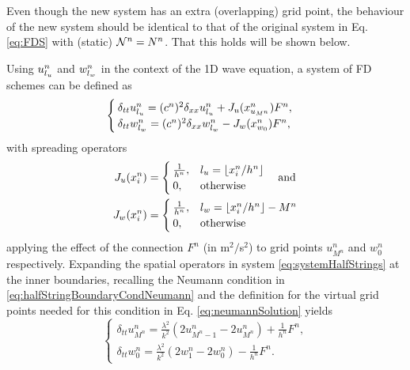 Even though the new system has an extra (overlapping) grid point, the behaviour of the new system should be identical to that of the original system in Eq. \eqref{eq:FDS} with (static) $\mathcal{N}^n = N^n$. That this holds will be shown below.

Using $u_{l_u}^n$ and $w_{l_w}^n$ in the context of the 1D wave equation, a system of FD schemes can be defined as
\begin{equation}
    \begin{cases}\label{eq:systemHalfStrings}
        \delta_{tt}u_{l_u}^n = (c^n)^2\delta_{xx}u_{l_u}^n + J_u(x_{u_{M^n}}^n)F^n,\\
        \delta_{tt}w_{l_w}^n = (c^n)^2\delta_{xx}w_{l_w}^n - J_w(x_{w_0}^n)F^n,
    \end{cases}
\end{equation}
with spreading operators
\begin{equation}\label{eq:spreadingOperators}
    \begin{aligned}
    J_u(x_i^n)& =
    \begin{cases}
        \frac{1}{h^n}, & {l_u} = \lfloor x_i^n/h^n\rfloor\\
        0,& \text{otherwise}
    \end{cases}
    \quad\text{and}\\
    J_w(x_i^n) &=
    \begin{cases}
        \frac{1}{h^n}, & {l_w} = \lfloor x_i^n/h^n \rfloor - M^n\\
        0,& \text{otherwise}
    \end{cases}
\end{aligned}
\end{equation}
applying the effect of the connection %
$F^n$ (in m$^2/$s$^2$) to grid points $u_{M^n}^n$ and $w_0^n$ respectively.
%
Expanding the spatial operators in system \eqref{eq:systemHalfStrings} at the inner boundaries, recalling the Neumann condition in  \eqref{eq:halfStringBoundaryCondNeumann} and the definition for the virtual grid points needed for this condition in Eq. \eqref{eq:neumannSolution} yields
\begin{equation}\label{eq:expandedSystem}
    \begin{cases}
        \delta_{tt}u_{M^n}^n = \frac{\lambda^2}{k^2}(2u_{M^n-1}^n-2u_{M^n}^n) + \frac{1}{h^n}F^n,\\
        \delta_{tt}w_0^n = \frac{\lambda^2}{k^2}(2w_1^n-2w_0^n) - \frac{1}{h^n}F^n.
    \end{cases}
\end{equation}
